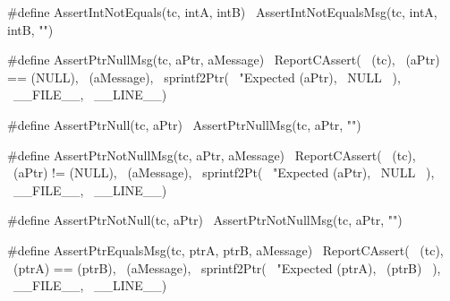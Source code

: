 {#define AssertIntNotEquals(tc, intA, intB) \
  AssertIntNotEqualsMsg(tc, intA, intB, "")
\stopCHeader

\stopTestSuite

\startTestSuite[assertPrtNull]

\startCHeader
#define AssertPtrNullMsg(tc, aPtr, aMessage) \
  ReportCAssert(                             \
    (tc),                                    \
    (aPtr) == (NULL),                        \
    (aMessage),                              \
    sprintf2Ptr(                             \
      "Expected %
      (aPtr),                                \
      NULL                                   \
    ),                                       \
    __FILE__,                                \
    __LINE__)

#define AssertPtrNull(tc, aPtr) \
  AssertPtrNullMsg(tc, aPtr, "")
\stopCHeader

\stopTestSuite

\startTestSuite[assertPtrNotNull]

\startCHeader
#define AssertPtrNotNullMsg(tc, aPtr, aMessage) \
  ReportCAssert(                                \
    (tc),                                       \
    (aPtr) != (NULL),                           \
    (aMessage),                                 \
    sprintf2Pt(                                 \
      "Expected %
      (aPtr),                                   \
      NULL                                      \
    ),                                          \
    __FILE__,                                   \
    __LINE__)

#define AssertPtrNotNull(tc, aPtr) \
  AssertPtrNotNullMsg(tc, aPtr, "")
\stopCHeader

\stopTestSuite

\startTestSuite[assertPtrEquals]

\startCHeader
#define AssertPtrEqualsMsg(tc, ptrA, ptrB, aMessage) \
  ReportCAssert(                                     \
    (tc),                                            \
    (ptrA) == (ptrB),                                \
    (aMessage),                                      \
    sprintf2Ptr(                                     \
      "Expected %
      (ptrA),                                        \
      (ptrB)                                         \
    ),                                               \
    __FILE__,                                        \
    __LINE__)

}
